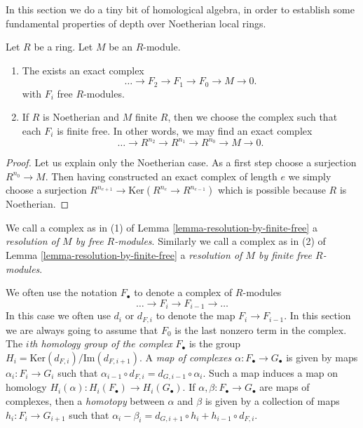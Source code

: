 \noindent
In this section we do a tiny bit of homological algebra,
in order to establish some fundamental properties of
depth over Noetherian local rings.

\begin{lemma}
\label{lemma-resolution-by-finite-free}
Let $R$ be a ring. Let $M$ be an $R$-module.
\begin{enumerate}
\item The exists an exact complex
$$
\ldots \to F_2 \to F_1 \to F_0 \to M \to 0.
$$
with $F_i$ free $R$-modules.
\item If $R$ is Noetherian and $M$ finite $R$, then we
choose the complex such that each $F_i$ is finite free.
In other words, we may find an exact complex
$$
\ldots \to R^{n_2} \to R^{n_1} \to R^{n_0} \to M \to 0.
$$
\end{enumerate}
\end{lemma}

\begin{proof}
Let us explain only the Noetherian case.
As a first step choose a surjection $R^{n_0} \to M$.
Then having constructed an exact complex of length
$e$ we simply choose a surjection $R^{n_{e + 1}} \to
\text{Ker}(R^{n_e} \to R^{n_{e-1}})$ which is possible
because $R$ is Noetherian.
\end{proof}

\begin{definition}
\label{definition-finite-free-resolution}
We call a complex as in (1) of
Lemma \ref{lemma-resolution-by-finite-free}
a {\it resolution of $M$ by free $R$-modules}.
Similarly we call a complex as in (2) of
Lemma \ref{lemma-resolution-by-finite-free}
a {\it resolution of $M$ by finite free $R$-modules}.
\end{definition}

\noindent
We often use the notation $F_{\bullet}$ to denote a complex
of $R$-modules
$$
\ldots \to F_i \to F_{i-1} \to \ldots
$$
In this case we often use $d_i$ or $d_{F, i}$ to denote the map
$F_i \to F_{i-1}$. In this section we are always going to
assume that $F_0$ is the last nonzero term in the complex.
The {\it $i$th homology group of the complex} $F_{\bullet}$
is the group $H_i = \text{Ker}(d_{F, i})/\text{Im}(d_{F, i + 1})$.
A {\it map of complexes $\alpha : F_{\bullet} \to G_{\bullet}$}
is given by maps $\alpha_i : F_i \to G_i$ such that
$\alpha_{i-1} \circ d_{F, i} = d_{G, i-1} \circ \alpha_i$.
Such a map induces a map on homology $H_i(\alpha) :
H_i(F_{\bullet}) \to H_i(G_{\bullet})$. If $\alpha, \beta
:  F_{\bullet} \to G_{\bullet}$ are maps of complexes, then
a {\it homotopy} between $\alpha$ and $\beta$ is given by
a collection of maps $h_i : F_i \to G_{i + 1}$ such that
$\alpha_i - \beta_i = d_{G, i + 1} \circ h_i +
h_{i-1} \circ d_{F, i}$.

